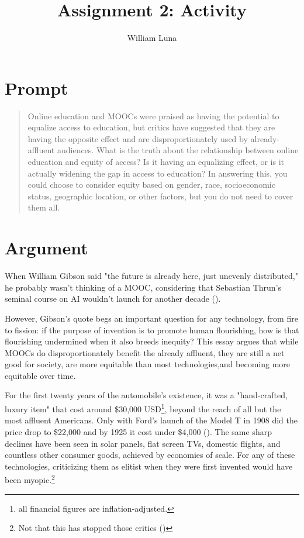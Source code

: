 \documentclass[
	letterpaper, %
]{jdf}
\author{William Luna}
\title{Assignment 2: Activity}
\begin{document}
\newcommand{\pcite}[1]{(\cite{#1})}

\maketitle

\section{Prompt} 

\blockquote{Online education and MOOCs were praised as having the potential to equalize access to education, but critics have suggested that they are having the opposite effect and are disproportionately used by already-affluent audiences. What is the truth about the relationship between online education and equity of access? Is it having an equalizing effect, or is it actually widening the gap in access to education? In answering this, you could choose to consider equity based on gender, race, socioeconomic status, geographic location, or other factors, but you do not need to cover them all.}

\section{Argument}

When William Gibson said "the future is already here, just unevenly distributed," he probably wasn't thinking of a MOOC, considering that Sebastian Thrun's seminal course on AI wouldn't launch for another decade \pcite{gibson, Thrun2012}.

However, Gibson's quote begs an important question for any technology, from fire to fission: if the purpose of invention is to promote human flourishing, how is that flourishing undermined when it also breeds inequity? This essay argues that while MOOCs do disproportionately benefit the already affluent, they are still a net good for society, are more equitable than most technologies,and becoming more equitable over time.

For the first twenty years of the automobile's existence, it was a "hand-crafted, luxury item" that cost around \$30,000 USD\footnote{all financial figures are inflation-adjusted.}, beyond the reach of all but the most affluent Americans. Only with Ford's launch of the Model T in 1908 did the price drop to \$22,000 and by 1925 it cost under \$4,000 \pcite{ford}. The same sharp declines have been seen in solar panels, flat screen TVs, domestic flights, and countless other consumer goods, achieved by economies of scale. For any of these technologies, criticizing them as elitist when they were first invented would have been myopic.\footnote{Not that this has stopped those critics \pcite{StanfordSolarPanels2022}}
\end{document}
